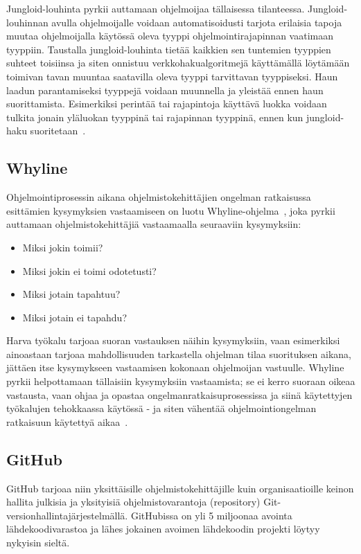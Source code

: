 \documentclass[finnish]{tktltiki2}
\theoremstyle{definition}
\theoremstyle{remark}
\begin{document}
Jungloid-louhinta pyrkii auttamaan ohjelmoijaa tällaisessa tilanteessa. Jungloid-louhinnan avulla ohjelmoijalle voidaan automatisoidusti tarjota erilaisia tapoja muutaa ohjelmoijalla käytössä oleva tyyppi ohjelmointirajapinnan vaatimaan tyyppiin. Taustalla jungloid-louhinta tietää kaikkien sen tuntemien tyyppien suhteet toisiinsa ja siten onnistuu verkkohakualgoritmejä käyttämällä löytämään toimivan tavan muuntaa saatavilla oleva tyyppi tarvittavan tyyppiseksi. Haun laadun parantamiseksi tyyppejä voidaan muunnella ja yleistää ennen haun suorittamista. Esimerkiksi perintää tai rajapintoja käyttävä luokka voidaan tulkita jonain yläluokan tyyppinä tai rajapinnan tyyppinä, ennen kun jungloid-haku suoritetaan~\cite{jungloid-mining}.

\subsection{Whyline}
Ohjelmointiprosessin aikana ohjelmistokehittäjien ongelman ratkaisussa esittämien kysymyksien vastaamiseen on luotu Whyline-ohjelma~\cite{whyline}, joka pyrkii auttamaan ohjelmistokehittäjiä vastaamaalla seuraaviin kysymyksiin:

\begin{itemize}
  \item Miksi jokin toimii?
  \item Miksi jokin ei toimi odotetusti?
  \item Miksi jotain tapahtuu?
  \item Miksi jotain ei tapahdu?
\end{itemize}

Harva työkalu tarjoaa suoran vastauksen näihin kysymyksiin, vaan esimerkiksi ainoastaan tarjoaa mahdollisuuden tarkastella ohjelman tilaa suorituksen aikana, jättäen itse kysymykseen vastaamisen kokonaan ohjelmoijan vastuulle.
Whyline pyrkii helpottamaan tällaisiin kysymyksiin vastaamista; se ei kerro suoraan oikeaa vastausta, vaan ohjaa ja opastaa ongelmanratkaisuprosessissa ja siinä käytettyjen työkalujen tehokkaassa käytössä - ja siten vähentää ohjelmointiongelman ratkaisuun käytettyä aikaa~\cite{whyline}.

\subsection{GitHub}
GitHub tarjoaa niin yksittäisille ohjelmistokehittäjille kuin organisaatioille keinon hallita julkisia ja yksityisiä ohjelmistovarantoja (repository) Git-versionhallintajärjestelmällä. GitHubissa on yli 5 miljoonaa avointa lähdekoodivarastoa ja lähes jokainen avoimen lähdekoodin projekti löytyy nykyisin sieltä.
\end{document}
